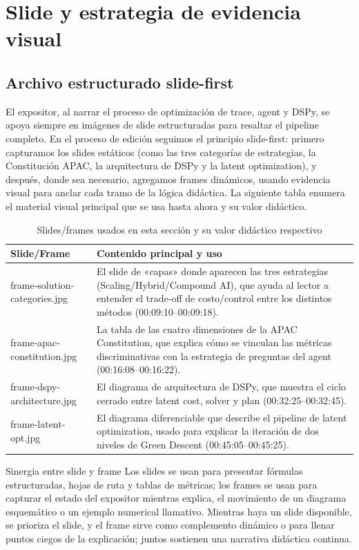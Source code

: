 \section{Slide y estrategia de evidencia visual}

\subsection{Archivo estructurado slide-first}
El expositor, al narrar el proceso de optimización de trace, agent y DSPy, se apoya siempre en imágenes de slide estructuradas para resaltar el pipeline completo. En el proceso de edición seguimos el principio slide-first: primero capturamos los slides estáticos (como las tres categorías de estrategias, la Constitución APAC, la arquitectura de DSPy y la latent optimization), y después, donde sea necesario, agregamos frames dinámicos, usando evidencia visual para anclar cada tramo de la lógica didáctica. La siguiente tabla enumera el material visual principal que se usa hasta ahora y su valor didáctico.
\begin{table}[H]
\centering
\begin{tabular}{lp{8cm}}
\toprule
Slide/Frame & Contenido principal y uso \\
\midrule
frame-solution-categories.jpg & El slide de «capas» donde aparecen las tres estrategias (Scaling/Hybrid/Compound AI), que ayuda al lector a entender el trade-off de costo/control entre los distintos métodos (00:09:10--00:09:18). \\
frame-apac-constitution.jpg & La tabla de las cuatro dimensiones de la APAC Constitution, que explica cómo se vinculan las métricas discriminativas con la estrategia de preguntas del agent (00:16:08--00:16:22). \\
frame-dspy-architecture.jpg & El diagrama de arquitectura de DSPy, que muestra el ciclo cerrado entre latent cost, solver y plan (00:32:25--00:32:45). \\
frame-latent-opt.jpg & El diagrama diferenciable que describe el pipeline de latent optimization, usado para explicar la iteración de dos niveles de Green Descent (00:45:05--00:45:25). \\
\bottomrule
\end{tabular}
\caption{Slides/frames usados en esta sección y su valor didáctico respectivo}
\end{table}
\begin{knowledgebox}{Sinergia entre slide y frame}
Los slides se usan para presentar fórmulas estructuradas, hojas de ruta y tablas de métricas; los frames se usan para capturar el estado del expositor mientras explica, el movimiento de un diagrama esquemático o un ejemplo numerical llamativo. Mientras haya un slide disponible, se prioriza el slide, y el frame sirve como complemento dinámico o para llenar puntos ciegos de la explicación; juntos sostienen una narrativa didáctica continua.
\end{knowledgebox}

